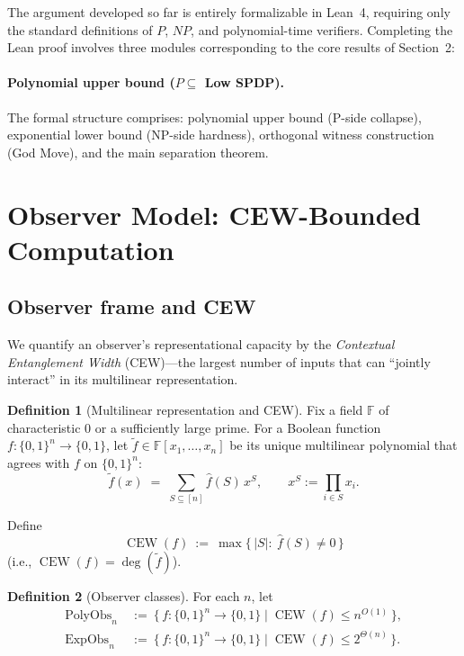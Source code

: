 \documentclass[12pt]{article}
\theoremstyle{definition}
\newtheorem{definition}{Definition}
\theoremstyle{definition}
\theoremstyle{remark}
\theoremstyle{remark}
\begin{document}
The argument developed so far is entirely formalizable in Lean~4, requiring only the standard definitions of $P$, $NP$, and polynomial-time verifiers.
Completing the Lean proof involves three modules corresponding to the core results of Section~2:

\paragraph{Polynomial upper bound ($P \subseteq$ Low SPDP).}


The formal structure comprises: polynomial upper bound (P-side collapse), exponential lower bound (NP-side hardness), orthogonal witness construction (God Move), and the main separation theorem.

\section{Observer Model: CEW-Bounded Computation}
\label{sec:observer}

\subsection{Observer frame and CEW}

We quantify an observer's representational capacity by the \emph{Contextual Entanglement Width} (CEW)---the largest number of inputs that can ``jointly interact'' in its multilinear representation.

\begin{definition}[Multilinear representation and CEW]\label{def:cew}
Fix a field $\mathbb{F}$ of characteristic $0$ or a sufficiently large prime.
For a Boolean function $f:\{0,1\}^n\to\{0,1\}$, let $\tilde f\in\mathbb{F}[x_1,\dots,x_n]$ be its unique multilinear polynomial that agrees with $f$ on $\{0,1\}^n$:
\[
\tilde f(x) \;=\; \sum_{S\subseteq [n]} \hat f(S)\,x^S, \qquad x^S := \prod_{i\in S} x_i.
\]

Define
\[
\operatorname{CEW}(f) \ :=\ \max\{\,|S|:\ \hat f(S)\neq 0\,\}
\]
(i.e., $\operatorname{CEW}(f) = \deg(\tilde f)$).
\end{definition}

\begin{definition}[Observer classes]\label{def:observer-classes}
For each $n$, let
\begin{align*}
\mathrm{PolyObs}_n \ &:=\ \{\,f:\{0,1\}^n\to\{0,1\} \mid \operatorname{CEW}(f)\le n^{O(1)}\,\}, \\
\mathrm{ExpObs}_n \ &:=\ \{\,f:\{0,1\}^n\to\{0,1\} \mid \operatorname{CEW}(f)\le 2^{\Theta(n)}\,\}.
\end{align*}
\end{definition}
\end{document}
